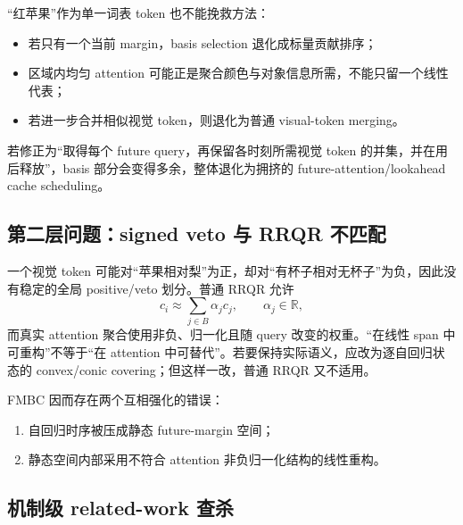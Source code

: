 \documentclass[UTF8,zihao=-4,a4paper]{ctexart}
\begin{document}
“红苹果”作为单一词表 token 也不能挽救方法：

\begin{itemize}
  \item 若只有一个当前 margin，basis selection 退化成标量贡献排序；
  \item 区域内均匀 attention 可能正是聚合颜色与对象信息所需，不能只留一个线性代表；
  \item 若进一步合并相似视觉 token，则退化为普通 visual-token merging。
\end{itemize}

若修正为“取得每个 future query，再保留各时刻所需视觉 token 的并集，并在用后释放”，basis 部分会变得多余，整体退化为拥挤的 future-attention/lookahead cache scheduling。

\subsection{第二层问题：signed veto 与 RRQR 不匹配}

一个视觉 token 可能对“苹果相对梨”为正，却对“有杯子相对无杯子”为负，因此没有稳定的全局 positive/veto 划分。普通 RRQR 允许
\[
c_i\approx\sum_{j\in B}\alpha_jc_j,
\qquad \alpha_j\in\mathbb{R},
\]
而真实 attention 聚合使用非负、归一化且随 query 改变的权重。“在线性 span 中可重构”不等于“在 attention 中可替代”。若要保持实际语义，应改为逐自回归状态的 convex/conic covering；但这样一改，普通 RRQR 又不适用。

FMBC 因而存在两个互相强化的错误：

\begin{enumerate}
  \item 自回归时序被压成静态 future-margin 空间；
  \item 静态空间内部采用不符合 attention 非负归一化结构的线性重构。
\end{enumerate}

\subsection{机制级 related-work 查杀}
\end{document}
